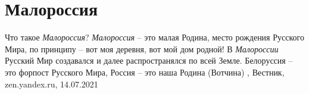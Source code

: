  
 
 
 
 
\chapter{Малороссия}
\label{sec:slova.malorossia}

Что такое \emph{Малороссия}?  \emph{Малороссия} – это малая Родина, место рождения Русского
Мира, по принципу – вот моя деревня, вот мой дом родной! В \emph{Малороссии} Русский
Мир создавался и далее распространялся по всей Земле. Белоруссия – это форпост
Русского Мира, Россия – это наша Родина (Вотчина)
, Вестник, zen.yandex.ru, 14.07.2021
